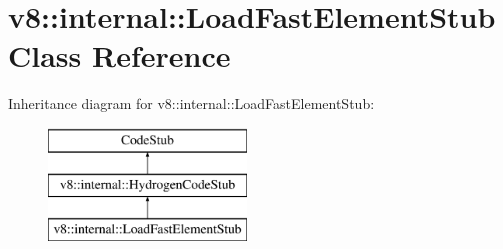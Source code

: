 \hypertarget{classv8_1_1internal_1_1_load_fast_element_stub}{}\section{v8\+:\+:internal\+:\+:Load\+Fast\+Element\+Stub Class Reference}
\label{classv8_1_1internal_1_1_load_fast_element_stub}
Inheritance diagram for v8\+:\+:internal\+:\+:Load\+Fast\+Element\+Stub\+:\begin{figure}[H]
\begin{center}
\leavevmode
\includegraphics[height=3.000000cm]{classv8_1_1internal_1_1_load_fast_element_stub}
\end{center}
\end{figure}

